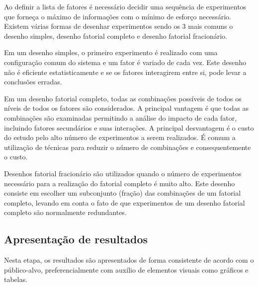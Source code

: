 Ao definir a lista de fatores é necessário decidir uma sequência de experimentos que forneça o máximo de informações com o mínimo de esforço necessário. Existem várias formas de desenhar experimentos sendo os 3 mais comuns o desenho simples, desenho fatorial completo e desenho fatorial fracionário.

Em um desenho simples, o primeiro experimento é realizado com uma configuração comum do sistema e um fator é variado de cada vez. Este desenho não é eficiente estatisticamente e se os fatores interagirem entre si, pode levar a conclusões erradas.

Em um desenho fatorial completo, todas as combinações possíveis de todos os níveis de todos os fatores são considerados. A principal vantagem é que todas as combinações são examinadas permitindo a análise do impacto de cada fator, incluindo fatores secundários e suas interações. A principal desvantagem é o custo do estudo pelo alto número de experimentos a serem realizados. É comum a utilização de técnicas para reduzir o número de combinações e consequentemente o custo.

Desenhos fatorial fracionário são utilizados quando o número de experimentos necessário para a realização do fatorial completo é muito alto. Este desenho consiste em escolher um subconjunto (fração) das combinações de um fatorial completo, levando em conta o fato de que experimentos de um desenho fatorial completo são normalmente redundantes.

\subsection{Apresentação de resultados}

Nesta etapa, os resultados são apresentados de forma consistente de acordo com o público-alvo, preferencialmente com auxílio de elementos visuais como gráficos e tabelas.
